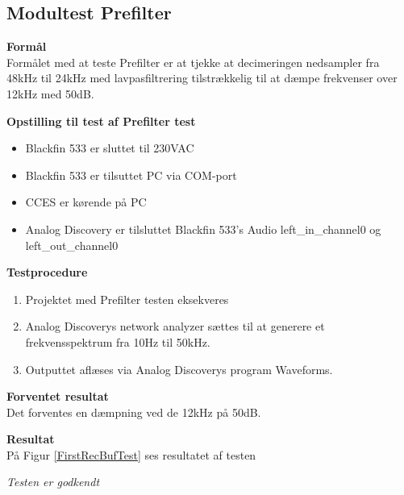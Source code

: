 \subsection{Modultest Prefilter}

\textbf{Formål} \\
Formålet med at teste Prefilter er at tjekke at decimeringen nedsampler fra 48kHz til 24kHz med lavpasfiltrering tilstrækkelig til at dæmpe frekvenser over 12kHz med 50dB. 

\textbf{Opstilling til test af Prefilter test}

\begin{itemize}
	\item Blackfin 533 er sluttet til 230VAC
	\item Blackfin 533 er tilsuttet PC via COM-port
	\item CCES er kørende på PC
	\item Analog Discovery er tilsluttet Blackfin 533's Audio left\_in\_channel0 og left\_out\_channel0
\end{itemize}

\textbf{Testprocedure}
\begin{enumerate}
	\item Projektet med Prefilter testen eksekveres 
	\item Analog Discoverys network analyzer sættes til at generere et frekvensspektrum fra 10Hz til 50kHz. 
	\item Outputtet aflæses via Analog Discoverys program Waveforms. 
\end{enumerate}

\textbf{Forventet resultat} \\
Det forventes en dæmpning ved de 12kHz på 50dB.


\textbf{Resultat} \\


På Figur \ref{FirstRecBufTest} ses resultatet af testen





\textit{Testen er godkendt}






